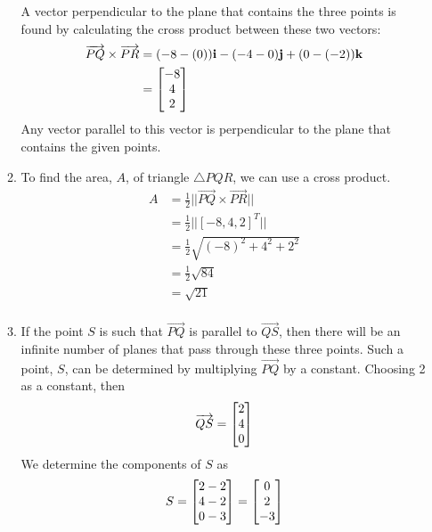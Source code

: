 \documentclass{article}
\begin{document}
\begin{enumerate}
\begin{enumerate}
A vector perpendicular to the plane that contains the three points is found by calculating the cross product between these two vectors:
\begin{align*}
\overrightarrow{PQ} \times \overrightarrow{PR} 
&= (-8-(0))\mathbf{i} - (-4-0)\mathbf{j}+(0-(-2))\mathbf{k} \\
&= \begin{bmatrix} -8 \\ 4 \\ 2 \end{bmatrix}
\end{align*}
Any vector parallel to this vector is perpendicular to the plane that contains the given points. 
\item
To find the area, $A$, of  triangle $\bigtriangleup PQR$, we can use a cross product.
\begin{align*}
A &= \frac{1}{2} \big|\big| \overrightarrow{PQ} \times \overrightarrow{PR} \big|\big| \\
&= \frac{1}{2} \big|\big| [-8,4,2]^T \big|\big| \\
&= \frac{1}{2} \sqrt{ (-8)^2+4^2+2^2} \\
&= \frac{1}{2} \sqrt{ 84} \ \\
&= \sqrt{21} \\
\end{align*}
\item
If the point $S$ is such that $\overrightarrow{PQ}$ is parallel to $\overrightarrow{QS}$, then there will be an infinite number of planes that pass through these three points. Such a point, $S$, can be determined by multiplying $\overrightarrow{PQ}$ by a constant. Choosing 2 as a constant, then 
\begin{align*}
\overrightarrow{QS} &= \begin{bmatrix} 2 \\ 4 \\ 0 \end{bmatrix}\\
\end{align*}
We determine the components of $S$ as
\begin{align*}
S &= \begin{bmatrix} 2-2 \\ 4-2 \\ 0-3 \end{bmatrix} = \begin{bmatrix} 0 \\ 2 \\ -3 \end{bmatrix}\\
\end{align*}
\end{enumerate}




\end{enumerate}
\end{document}
